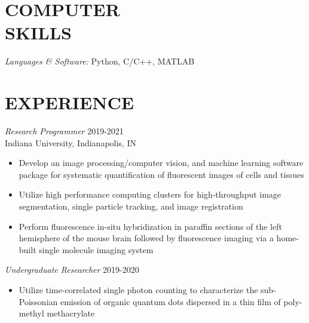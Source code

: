 \documentclass[margin, 10pt]{res} %
\begin{document}
\begin{resume}

\section{COMPUTER \\ SKILLS} 

{\sl Languages \& Software:} 
Python, C/C++, MATLAB \\
 
 
\section{EXPERIENCE}

{\sl Research Programmer} \hfill 2019-2021 \\
Indiana University, Indianapolis, IN

\begin{itemize} \itemsep -2pt %

\item Develop an image processing/computer vision, and machine learning software package for systematic quantification of fluorescent images of cells and tissues

\item Utilize high performance computing clusters for high-throughput image segmentation, single particle tracking, and image registration

\item Perform fluorescence in-situ hybridization in paraffin sections of the left hemisphere of the mouse brain followed by fluorescence imaging via a home-built single molecule imaging system
 
\end{itemize}
 
{\sl Undergraduate Researcher} \hfill 2019-2020
\begin{itemize} \itemsep -2pt %

\item Utilize time-correlated single photon counting to characterize the sub-Poissonian emission of organic quantum dots dispersed in a thin film of poly-methyl methacrylate


\end{itemize}
\end{resume}
\end{document}
